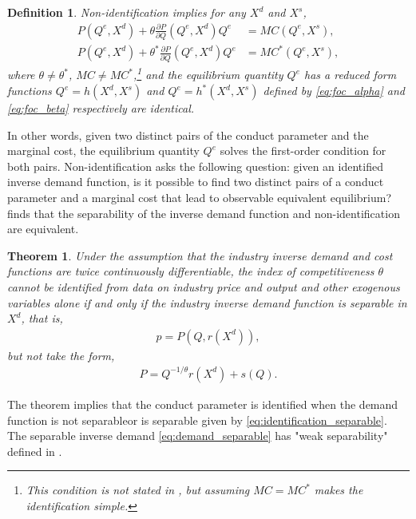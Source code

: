 \documentclass[11pt, a4paper]{article}
\newtheorem{theorem}{Theorem}
\newtheorem{definition}{Definition}
\theoremstyle{remark}
\begin{document}
\begin{definition}\label{def:non_identification}
Non-identification implies for any $X^{d}$ and $X^{s}$,
\begin{align}
P(Q^e, X^{d}) + \theta \frac{\partial P}{\partial Q}(Q^e, X^{d})Q^e &= MC(Q^e, X^{s}),  \label{eq:foc_alpha}\\
P(Q^e, X^{d}) + \theta^{*} \frac{\partial P}{\partial Q}(Q^e, X^{d})Q^e &= MC^{*}(Q^e, X^{s}),\label{eq:foc_beta}
\end{align}
where $\theta \neq \theta^{*}$, $MC \ne MC^{*}$,\footnote{This condition is not stated in \citet{lau1982identifying}, but assuming $MC = MC^{*}$ makes the identification simple.} and the equilibrium quantity $Q^e$ has a reduced form functions $Q^e = h(X^{d}, X^{s})$ and $Q^e = h^{*}(X^{d}, X^{s})$ defined by \eqref{eq:foc_alpha} and \eqref{eq:foc_beta} respectively are identical.
\end{definition}

In other words, given two distinct pairs of the conduct parameter and the marginal cost, the equilibrium quantity $Q^e$ solves the first-order condition for both pairs.
Non-identification asks the following question: given an identified inverse demand function, is it possible to find two distinct pairs of a conduct parameter and a marginal cost that lead to observable equivalent equilibrium?
\citet{lau1982identifying} finds that the separability of the inverse demand function and non-identification are equivalent.

\begin{theorem}\label{theorem_lau}
    Under the assumption that the industry inverse demand and cost functions are twice continuously differentiable, the index of competitiveness $\theta$ cannot be identified from data on industry price and output and other exogenous variables alone if and only if the industry inverse demand function is separable in $X^{d}$, that is,
    \begin{align}
        p = P(Q, r(X^{d})), \label{eq:demand_separable}
    \end{align}
    but not take the form, 
    \begin{align}
        P = Q^{-1/\theta}r(X^{d}) + s(Q). \label{eq:identification_separable}
    \end{align}
\end{theorem}
The theorem implies that the conduct parameter is identified when the demand function is not separableor is separable given by \eqref{eq:identification_separable}.
The separable inverse demand \eqref{eq:demand_separable} has "weak separability" defined in \citet{goldmanNote1964}. 
\end{document}

